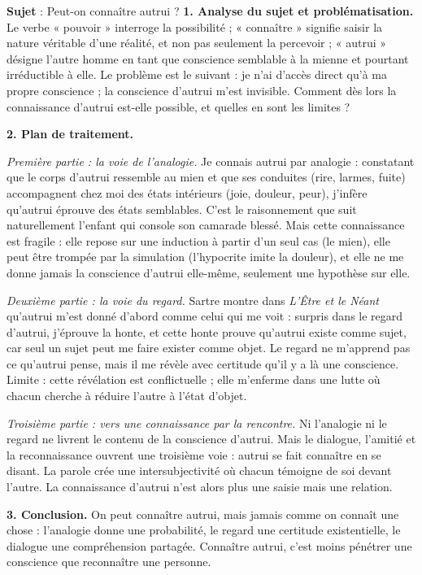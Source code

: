 \documentclass[11pt]{article}
\newcommand{\cle}[1]{{\popxbold\color{popdark}#1}}
\begin{document}
\begin{exoresolu}
\textbf{Sujet} : Peut-on connaître autrui ?
\tcblower
\textbf{1. Analyse du sujet et problématisation.} Le verbe « pouvoir » interroge la possibilité ; « connaître » signifie saisir la nature véritable d'une réalité, et non pas seulement la percevoir ; « \cle{autrui} » désigne l'autre homme en tant que conscience semblable à la mienne et pourtant irréductible à elle. Le problème est le suivant : je n'ai d'accès direct qu'à ma propre conscience ; la conscience d'autrui m'est invisible. Comment dès lors la connaissance d'autrui est-elle possible, et quelles en sont les limites ?

\textbf{2. Plan de traitement.}

\emph{Première partie : la voie de l'analogie.} Je connais autrui par analogie : constatant que le corps d'autrui ressemble au mien et que ses conduites (rire, larmes, fuite) accompagnent chez moi des états intérieurs (joie, douleur, peur), j'infère qu'autrui éprouve des états semblables. C'est le raisonnement que suit naturellement l'enfant qui console son camarade blessé. Mais cette connaissance est fragile : elle repose sur une induction à partir d'un seul cas (le mien), elle peut être trompée par la simulation (l'hypocrite imite la douleur), et elle ne me donne jamais la conscience d'autrui elle-même, seulement une hypothèse sur elle.

\emph{Deuxième partie : la voie du regard.} Sartre montre dans \emph{L'Être et le Néant} qu'autrui m'est donné d'abord comme celui qui me voit : surpris dans le regard d'autrui, j'éprouve la \cle{honte}, et cette honte prouve qu'autrui existe comme sujet, car seul un sujet peut me faire exister comme objet. Le regard ne m'apprend pas ce qu'autrui pense, mais il me révèle avec certitude qu'il y a là une conscience. Limite : cette révélation est conflictuelle ; elle m'enferme dans une lutte où chacun cherche à réduire l'autre à l'état d'objet.

\emph{Troisième partie : vers une connaissance par la rencontre.} Ni l'analogie ni le regard ne livrent le contenu de la conscience d'autrui. Mais le dialogue, l'\cle{amitié} et la reconnaissance ouvrent une troisième voie : autrui se fait connaître en se disant. La parole crée une \cle{intersubjectivité} où chacun témoigne de soi devant l'autre. La connaissance d'autrui n'est alors plus une saisie mais une relation.

\textbf{3. Conclusion.} On peut connaître autrui, mais jamais comme on connaît une chose : l'analogie donne une probabilité, le regard une certitude existentielle, le dialogue une compréhension partagée. Connaître autrui, c'est moins pénétrer une conscience que reconnaître une personne.
\end{exoresolu}
\end{document}
